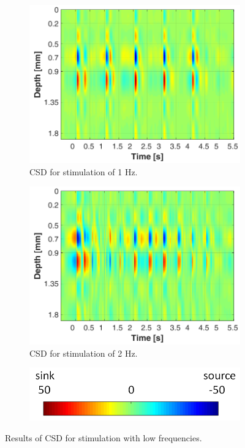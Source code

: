 \documentclass{pracalicmgr}
\begin{document}
    \begin{figure}[H]
	\begin{subfigure}{.5\textwidth}
		\centering
		\includegraphics[width=1.\linewidth]{csd_1Hz_5s.png}
		\caption{CSD for stimulation of 1 Hz.}
		\label{rys:csd_1Hz}
	\end{subfigure}
	\begin{subfigure}{.5\textwidth}
		\centering
		\includegraphics[width=1.\linewidth]{csd_2Hz_5s.png}
		\caption{CSD for stimulation of 2 Hz.}
		\label{rys:csd_2Hz}
	\end{subfigure}
	\begin{subfigure}{\textwidth}
		\centering
		\includegraphics[scale=0.4]{legend2.png}
	\end{subfigure}
	\caption{Results of CSD for stimulation with low frequencies.}
	\label{rys:csd_1_2}
	\end{figure}
\end{document}
